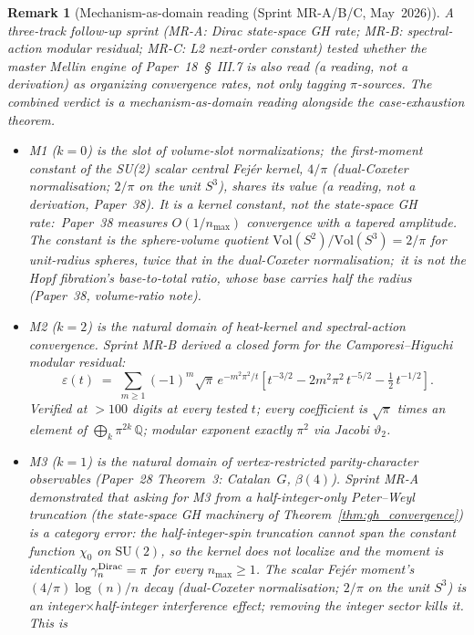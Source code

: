 \documentclass[11pt]{article}
\newtheorem{remark}{Remark}
\begin{document}
\begin{remark}[Mechanism-as-domain reading (Sprint MR-A/B/C, May~2026)]
\label{rem:master_mellin_domain}
A three-track follow-up sprint (MR-A: Dirac state-space GH rate;
MR-B: spectral-action modular residual; MR-C: L2 next-order
constant) tested whether the master Mellin engine of
Paper~18~\S~III.7 is also read (a reading, not a derivation) as
organizing convergence rates, not only tagging $\pi$-sources. The
combined verdict is a mechanism-as-domain \emph{reading} alongside the
case-exhaustion theorem.
\begin{itemize}
\item M1 ($k = 0$) is the slot of volume-slot normalizations;\ the
first-moment constant of the SU(2) scalar central Fej{\'e}r kernel,
$4/\pi$ (dual-Coxeter normalisation; $2/\pi$ on the unit $S^3$), shares
its value (a reading, not a derivation, Paper~38).  It is a kernel
constant, not the state-space GH rate:\ Paper~38 measures $O(1/n_{\max})$
convergence with a tapered amplitude.  The constant is the sphere-volume
quotient $\mathrm{Vol}(S^2)/\mathrm{Vol}(S^3) = 2/\pi$ for unit-radius
spheres, twice that in the dual-Coxeter normalisation;\ it is not the Hopf
fibration's base-to-total ratio, whose base carries half the radius
(Paper~38, volume-ratio note).
\item M2 ($k = 2$) is the natural domain of heat-kernel and
spectral-action convergence. Sprint MR-B derived a closed form for
the Camporesi--Higuchi modular residual:
$$
\varepsilon(t) \;=\; \sum_{m \ge 1} (-1)^m \sqrt{\pi}\,
e^{-m^2 \pi^2 / t}\left[t^{-3/2} - 2m^2 \pi^2\, t^{-5/2}
   - \tfrac{1}{2}\, t^{-1/2}\right].
$$
Verified at $> 100$ digits at every tested $t$; every coefficient is
$\sqrt{\pi}$ times an element of $\bigoplus_k \pi^{2k}\,\mathbb{Q}$; modular exponent
exactly $\pi^2$ via Jacobi $\vartheta_2$.
\item M3 ($k = 1$) is the natural domain of vertex-restricted
parity-character observables (Paper~28 Theorem~3:
Catalan~$G$, $\beta(4)$). Sprint MR-A demonstrated that asking
for M3 from a half-integer-only Peter--Weyl truncation (the
state-space GH machinery of Theorem~\ref{thm:gh_convergence}) is a
\emph{category error}: the half-integer-spin truncation cannot span
the constant function $\chi_0$ on $\mathrm{SU}(2)$, so the kernel
does not localize and the moment is identically $\gamma_n^{\rm Dirac}
= \pi$ for every $n_{\max} \ge 1$. The scalar Fej\'er moment's
$(4/\pi)\log(n)/n$ decay (dual-Coxeter normalisation; $2/\pi$ on the unit $S^3$) is an integer$\times$half-integer
interference effect; removing the integer sector kills it. This is

\end{itemize}
\end{remark}
\end{document}
